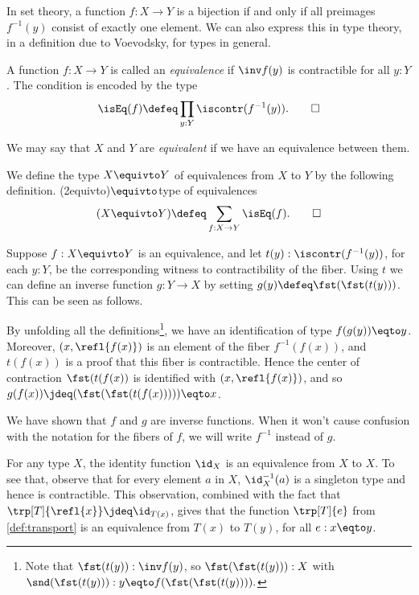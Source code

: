 In set theory, a function $f : X \to Y$ is a bijection if and only if
all preimages $f^{-1}(y)$ consist of exactly one element.
We can also express this in type theory, in a definition due
to Voevodsky, for types in general.

\begin{definition}
  \label{def:equivalence}
  A function $f : X \to Y$ is called an \emph{equivalence} if $\inv f(y)$ is contractible for
  all $y:Y$.  The condition is encoded by the type
\[
\isEq(f) \defeq \prod_{y:Y}\iscontr(f^{-1}(y)).\qedhere
\]
\end{definition}

We may say that $X$ and $Y$ are \emph{equivalent} if we
have an equivalence between them.

\begin{definition}
  \label{def:type-of-equivalences}
  We define the type $X \equivto Y$ of equivalences from $X$ to $Y$
  by the following definition.%
  \glossary(2equivto){$\protect\equivto$}{type of equivalences}
  \[
  (X \equivto Y) \defeq \sum_{f:X\to Y} \isEq(f).\qedhere
  \]
\end{definition}

Suppose $f:X \equivto Y$ is an equivalence, and let $t(y): \iscontr(f^{-1}(y))$, for each $y:Y$, be the corresponding witness to contractibility of the fiber.
Using $t$ we can define an inverse function $g : Y \to X$ by setting $g(y)\defeq\fst(\fst(t(y)))$. This can be seen as follows.

By unfolding all the definitions\footnote{%
  Note that $\fst(t(y)) : \inv f(y)$, so $\fst(\fst(t(y))) : X$ with
  $\snd(\fst(t(y))) : y \eqto f(\fst(\fst(t(y)))).$},
  we have an identification of type $f(g(y)) \eqto y$.
Moreover, $(x,\refl{f(x)})$ is an element of the
fiber $f^{-1}(f(x))$, and $t(f(x))$ is a proof
that this fiber is contractible. Hence the center of contraction
$\fst(t(f(x))$ is identified with $(x,\refl{f(x)})$, and so
$g(f(x))\jdeq(\fst(\fst(t(f(x))))) \eqto x$.

We have shown that $f$ and $g$ are inverse functions.
When it won't cause confusion with the notation for the fibers of $f$,
we will write $f^{-1}$ instead of $g$.

For any type $X$, the identity function $\id_X$ is an
equivalence from $X$ to $X$. To see that, observe that for every
element $a$ in $X$,
$\id_X^{-1}(a)$ is a singleton type and hence is contractible.
This observation, combined with the fact that
$\trp[T]{\refl{x}}\jdeq \id_{T(x)}$, gives that
the function $\trp[T]{e}$ from \cref{def:transport}
is an equivalence from $T(x)$ to $T(y)$, for all $e: x \eqto y$.

